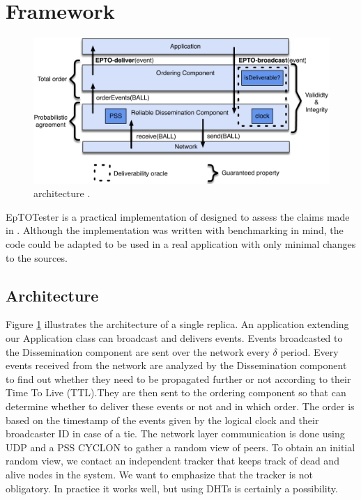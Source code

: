 \section{Framework}
\label{sec:epto}
\begin{figure}[htp]
	\includegraphics[width=\linewidth]{figures/architecture.pdf}
	\caption{\epto architecture \autocite{matos2015epto}.}
	\label{fig:epto-architecture}
\end{figure}
EpTOTester is a practical implementation of \epto designed to assess the claims made in \autocite{matos2015epto}. Although the implementation was written with benchmarking in mind, the code could be adapted to be used in a real application with only minimal changes to the sources.
\subsection{Architecture}
Figure \ref{fig:epto-architecture} illustrates the architecture of a single replica. An application extending our Application class can broadcast and delivers events. Events broadcasted to the Dissemination component are sent over the network every $\delta$ period. Every events received from the network are analyzed by the Dissemination component to find out whether they need to be propagated further or not according to their Time To Live (TTL).They are then sent to the ordering component so that \epto can determine whether to deliver these events or not and in which order. The order is based on the timestamp of the events given by the logical clock and their broadcaster ID in case of a tie. The network layer communication is done using UDP and a PSS CYCLON to gather a random view of peers. To obtain an initial random view, we contact an independent tracker that keeps track of dead and alive nodes in the system. We want to emphasize that the tracker is not obligatory. In practice it works well, but using DHTs is certainly a possibility.
